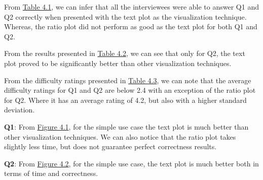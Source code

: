 \begin{description}[leftmargin=0pt]
\item[Correctness: ]From \hyperref[table:correctness]{Table 4.1}, we can infer that all the interviewees were able to answer Q1 and Q2 correctly when presented with the text plot as the visualization technique. Whereas, the ratio plot did not perform as good as the text plot for both Q1 and Q2.

\item[Time Measurements: ]From the results presented in \hyperref[table:time]{Table 4.2}, we can see that only for Q2, the text plot proved to be significantly better than other visualization techniques.

\item[Difficulty Ratings: ]From the difficulty ratings presented in \hyperref[table:rating]{Table 4.3}, we can note that the average difficulty ratings for Q1 and Q2 are below 2.4 with an exception of the ratio plot for Q2. Where it has an average rating of 4.2, but also with a higher standard deviation.

\end{description}

\textbf{Q1}: From \hyperref[figure:paretoOneQ1]{Figure 4.1}, for the simple use case the text plot is much better than other visualization techniques. We can also notice that the ratio plot takes slightly less time, but does not guarantee perfect correctness results.

\textbf{Q2}: From \hyperref[figure:paretoOneQ2]{Figure 4.2}, for the simple use case, the text plot is much better both in terms of time and correctness. 

